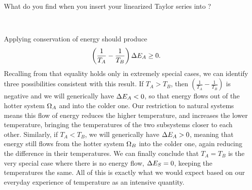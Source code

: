 \newpage %
What do you find when you insert your linearized Taylor series into ?
\begin{mdframed}
  \ \\[100 pt]
\end{mdframed}
Applying conservation of energy should produce
\begin{equation*}
  \left(\frac{1}{T_A} - \frac{1}{T_B}\right) \Delta E_A \geq 0.
\end{equation*}
Recalling from  that equality holds only in extremely special cases, we can identify three possibilities consistent with this result.
If $T_A > T_B$, then $\left(\frac{1}{T_A} - \frac{1}{T_B}\right)$ is negative and we will generically have $\Delta E_A < 0$, so that energy flows out of the hotter system $\Omega_A$ and into the colder one.
Our restriction to natural systems means this flow of energy reduces the higher temperature, and increases the lower temperature, bringing the temperatures of the two subsystems closer to each other.
Similarly, if $T_A < T_B$, we will generically have $\Delta E_A > 0$, meaning that energy still flows from the hotter system $\Omega_B$ into the colder one, again reducing the difference in their temperatures.
We can finally conclude that $T_A = T_B$ is the very special case where there is no energy flow, $\Delta E_S = 0$, keeping the temperatures the same.
All of this is exactly what we would expect based on our everyday experience of temperature as an intensive quantity.
